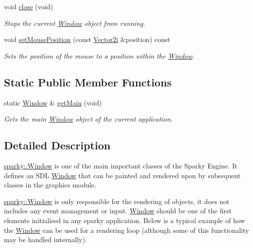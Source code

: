 \begin{DoxyCompactItemize}
void \hyperlink{classsparky_1_1_window_aa6bd21ac778ed3ae5696709f03e3bc75}{close} (void)
\begin{DoxyCompactList}\small\item\em Stops the current \hyperlink{classsparky_1_1_window}{Window} object from running. \end{DoxyCompactList}\item 
void \hyperlink{classsparky_1_1_window_a9f9dcfa2a2604447df62bd215fa9f138}{set\+Mouse\+Position} (const \hyperlink{classsparky_1_1_vector2}{Vector2i} \&position) const 
\begin{DoxyCompactList}\small\item\em Sets the position of the mouse to a position within the \hyperlink{classsparky_1_1_window}{Window}. \end{DoxyCompactList}\end{DoxyCompactItemize}
\subsection*{Static Public Member Functions}
\begin{DoxyCompactItemize}
\item 
static \hyperlink{classsparky_1_1_window}{Window} \& \hyperlink{classsparky_1_1_window_a642fe54d21bce0d226adeb06ada1689d}{get\+Main} (void)
\begin{DoxyCompactList}\small\item\em Gets the main \hyperlink{classsparky_1_1_window}{Window} object of the current application. \end{DoxyCompactList}\end{DoxyCompactItemize}


\subsection{Detailed Description}
\hyperlink{classsparky_1_1_window}{sparky\+::\+Window} is one of the main important classes of the Sparky Engine. It defines an S\+DL \hyperlink{classsparky_1_1_window}{Window} that can be painted and rendered upon by subsequent classes in the graphics module.

\hyperlink{classsparky_1_1_window}{sparky\+::\+Window} is only responsible for the rendering of objects, it does not includes any event management or input. \hyperlink{classsparky_1_1_window}{Window} should be one of the first elements initialised in any sparky application. Below is a typical example of how the \hyperlink{classsparky_1_1_window}{Window} can be used for a rendering loop (although some of this functionality may be handled internally).

